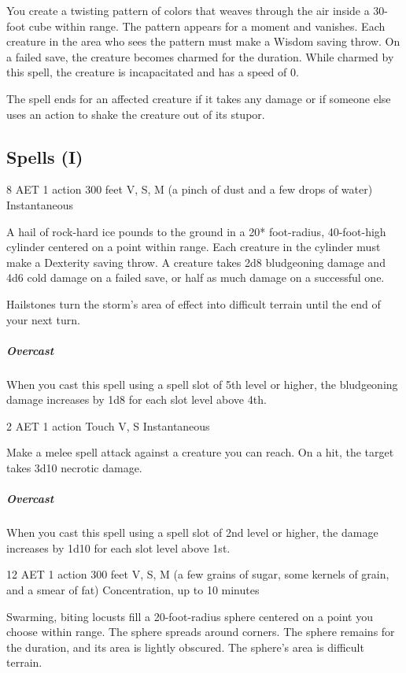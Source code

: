 You create a twisting pattern of colors that weaves through the air inside a 30-foot cube within range. The pattern appears for a moment and vanishes. Each creature in the area who sees the pattern must make a Wisdom saving throw. On a failed save, the creature becomes charmed for the duration. While charmed by this spell, the creature is incapacitated and has a speed of 0.

The spell ends for an affected creature if it takes any damage or if someone else uses an action to shake the creature out of its stupor.

\subsection{Spells (I)}
\label{spell:ice-storm}
{8 AET}
{1 action}
{300 feet}
{V, S, M (a pinch of dust and a few drops of water)}
{Instantaneous}

A hail of rock-hard ice pounds to the ground in a 20* foot-radius, 40-foot-high cylinder centered on a point within range. Each creature in the cylinder must make a Dexterity saving throw. A creature takes 2d8 bludgeoning damage and 4d6 cold damage on a failed save, or half as much damage on a successful one.

Hailstones turn the storm's area of effect into difficult terrain until the end of your next turn.
\subparagraph*{Overcast} When you cast this spell using a spell slot of 5th level or higher, the bludgeoning damage increases by 1d8 for each slot level above 4th.

\label{spell:inflict-wounds}
{2 AET}
{1 action}
{Touch}
{V, S}
{Instantaneous}

Make a melee spell attack against a creature you can reach. On a hit, the target takes 3d10 necrotic damage.
\subparagraph*{Overcast} When you cast this spell using a spell slot of 2nd level or higher, the damage increases by 1d10 for each slot level above 1st.

\label{spell:insect-plague}
{12 AET}
{1 action}
{300 feet}
{V, S, M (a few grains of sugar, some kernels of grain, and a smear of fat)}
{Concentration, up to 10 minutes}

Swarming, biting locusts fill a 20-foot-radius sphere centered on a point you choose within range. The sphere spreads around corners. The sphere remains for the duration, and its area is lightly obscured. The sphere's area is difficult terrain.

